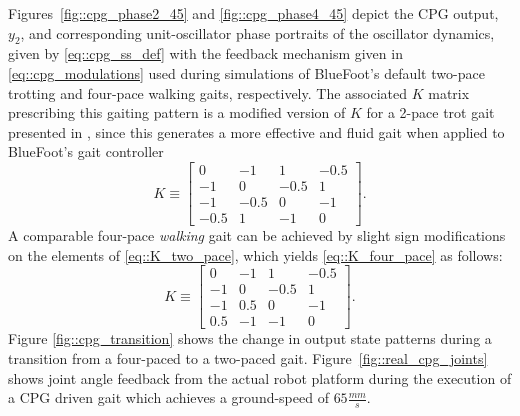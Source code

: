 			Figures~\ref{fig::cpg_phase2_45} and \ref{fig::cpg_phase4_45} depict the CPG output, $y_{2}$, and corresponding unit-oscillator phase portraits of the oscillator dynamics, given by \ref{eq::cpg_ss_def} with the feedback mechanism given in \ref{eq::cpg_modulations} used during simulations of BlueFoot's default two-pace trotting and four-pace walking gaits, respectively. The associated $K$ matrix prescribing this gaiting pattern is a modified version of $K$ for a 2-pace trot gait presented in \cite{Rutishauser2008}, since this generates a more effective and fluid gait when applied to BlueFoot's gait controller
				\begin{equation}
						K\equiv 
						\left[ 
						\begin{array}{cccc}
						 0	   	&	-1   	&	 	 1   	&		-0.5\\
						-1	   	&	 0   	&	 	-0.5   	&		 1 	\\
						-1    	&	-0.5   	&		0    	&	 	-1 	\\
						-0.5	&	 1   	&		-1    	&		 0
						\end{array}
						\right].
						\label{eq::K_two_pace}
				\end{equation}
			A comparable four-pace \emph{walking} gait can be achieved by slight sign modifications on the elements of  \ref{eq::K_two_pace}, which yields \ref{eq::K_four_pace} as follows:
				\begin{equation}
						K\equiv 
						\left[ 
						\begin{array}{cccc}
						 0	   	&	-1   	&	 	 1   	&	  	-0.5\\
						-1	   	&	 0   	&	 	-0.5   	&		 1 	\\
						-1    	&	 0.5   	&		 0    	&	 	-1 	\\
						 0.5	&	-1   	&		-1    	&		 0
						\end{array}
						\right].
						\label{eq::K_four_pace}
				\end{equation}
			Figure \ref{fig::cpg_transition} shows the change in output state patterns during a transition from a four-paced to a two-paced gait. Figure~\ref{fig::real_cpg_joints} shows joint angle feedback from the actual robot platform during the execution of a CPG driven gait which achieves a ground-speed of $65 \frac{mm}{s}$.
